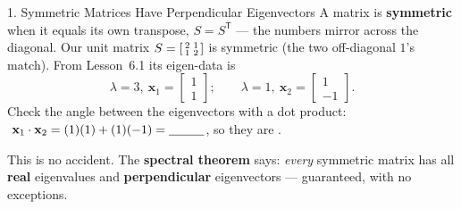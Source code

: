 \documentclass[10pt]{article}
\newcommand{\xx}{\mathbf{x}}
\newcommand{\T}{\mathsf{T}}
\begin{document}
\begin{notesbox}{1. Symmetric Matrices Have Perpendicular Eigenvectors}
A matrix is \textbf{symmetric} when it equals its own transpose, $S=S^{\T}$ --- the numbers mirror across
the diagonal. Our unit matrix $S=\begin{bsmallmatrix}2&1\\1&2\end{bsmallmatrix}$ is symmetric (the two
off-diagonal $1$'s match). From Lesson~6.1 its eigen-data is
\[
  \lambda=3,\ \xx_1=\begin{bmatrix}1\\1\end{bmatrix};\qquad \lambda=1,\ \xx_2=\begin{bmatrix}1\\-1\end{bmatrix}.
\]
Check the angle between the eigenvectors with a dot product:
$\ \xx_1\cdot\xx_2=(1)(1)+(1)(-1)=\blank{1.0cm}$, so they are \blank{2.4cm}.

\vspace{2pt}
This is no accident. The \textbf{spectral theorem} says: \emph{every} symmetric matrix has all \textbf{real}
eigenvalues and \textbf{perpendicular} eigenvectors --- guaranteed, with no exceptions.

\begin{center}
\end{center}
\end{notesbox}
\end{document}
